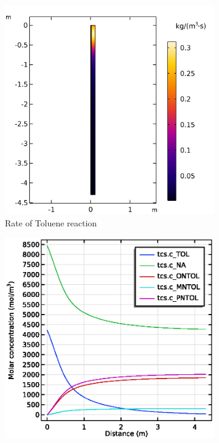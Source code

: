 \begin{figure}[p]
    
    \begin{minipage}{\linewidth}
        \centering
        \begin{subfigure}{0.45\linewidth}
            \includegraphics[width=\linewidth, scale=0.5]{figures/r_TOL.png}
            \caption{Rate of Toluene reaction}
            \label{fig:comsol-performance:r_TOL}
        \end{subfigure}\hspace{\floatsep}
        \begin{subfigure}{0.45\linewidth}
            \includegraphics[width=\linewidth, scale=0.5]{figures/concentration.eps}

\end{subfigure}
\end{minipage}
\end{figure}
